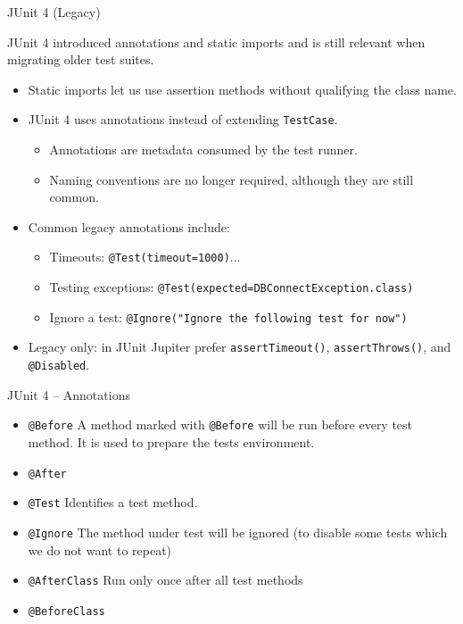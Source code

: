 \documentclass[11pt, xcolor=svgnames]{beamer}
\begin{document}
\begin{frame}{JUnit 4 (Legacy)}

JUnit 4 introduced annotations and static imports and is still relevant when migrating older test suites.
\begin{itemize}
  \item Static imports let us use assertion methods without qualifying the class name.
  \item JUnit 4 uses annotations instead of extending \texttt{TestCase}.
  \begin{itemize}
    \item Annotations are metadata consumed by the test runner.
    \item Naming conventions are no longer required, although they are still common.
  \end{itemize}
  \item Common legacy annotations include:
  \begin{itemize}
    \item Timeouts: \texttt{@Test(timeout=1000)}...
    \item Testing exceptions: \texttt{@Test(expected=DBConnectException.class)} 
    \item Ignore a test: \texttt{@Ignore("Ignore the following test for now")}
  \end{itemize}
  \item Legacy only: in JUnit Jupiter prefer \texttt{assertTimeout()}, \texttt{assertThrows()}, and \texttt{@Disabled}.
\end{itemize}

\end{frame}



\begin{frame}{JUnit 4 -- Annotations}

\begin{itemize}
  \item \texttt{@Before} A method marked with \texttt{@Before} will be run before every test method. It is used to prepare the tests environment.
  \item \texttt{@After}
  \item \texttt{@Test} Identifies a test method.
  \item \texttt{@Ignore} The method under test will be ignored (to disable some tests which we do not want to repeat)
  \item \texttt{@AfterClass} Run only once after all test methods
  \item \texttt{@BeforeClass}
  \end{itemize}
\end{frame}
\end{document}
